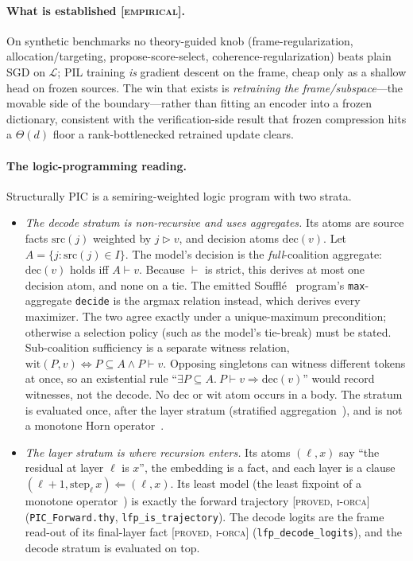 \documentclass[11pt]{article}
\theoremstyle{definition}
\theoremstyle{plain}
\theoremstyle{remark}
\newcommand{\proved}{\textsc{[proved, i-orca]}}
\newcommand{\empirical}{\textsc{[empirical]}}
\begin{document}
\paragraph{What is established \empirical{}.} On synthetic benchmarks no theory-guided knob
(frame-regularization, allocation/targeting, propose-score-select, coherence-regularization) beats plain
SGD on $\mathcal{L}$; PIL training \emph{is} gradient descent on the frame, cheap only as a shallow head
on frozen sources. The win that exists is \emph{retraining the frame/subspace}---the movable side of the
boundary---rather than fitting an encoder into a frozen dictionary, consistent with the verification-side
result that frozen compression hits a $\Theta(d)$ floor a rank-bottlenecked retrained update clears.

\paragraph{The logic-programming reading.} Structurally PIC is a semiring-weighted logic program with
two strata.
\begin{itemize}[nosep]
  \item \emph{The decode stratum is non-recursive and uses aggregates.} Its atoms are source facts
        $\mathrm{src}(j)$ weighted by $j\triangleright v$, and decision atoms $\mathrm{dec}(v)$. Let
        $A=\{j:\mathrm{src}(j)\in I\}$. The model's decision is the \emph{full}-coalition aggregate:
        $\mathrm{dec}(v)$ holds iff $A\vdash v$. Because $\vdash$ is strict, this derives at most one
        decision atom, and none on a tie. The emitted Souffl\'e~\cite{jordan2016souffle} program's \texttt{max}-aggregate \texttt{decide} is the
        argmax relation instead, which derives every maximizer. The two agree exactly under a
        unique-maximum precondition; otherwise a selection policy (such as the model's tie-break) must be
        stated. Sub-coalition
        sufficiency is a separate witness relation,
        $\mathrm{wit}(P,v)\Leftrightarrow P\subseteq A\wedge P\vdash v$. Opposing singletons can witness
        different tokens at once, so an existential rule
        ``$\exists P\subseteq A.\ P\vdash v\Rightarrow\mathrm{dec}(v)$'' would record witnesses, not the
        decode. No $\mathrm{dec}$ or $\mathrm{wit}$ atom occurs in a body. The stratum is evaluated once,
        after the layer stratum (stratified aggregation~\cite{apt1988towards}), and is not a monotone Horn
        operator~\cite{vanemden1976semantics}.
  \item \emph{The layer stratum is where recursion enters.} Its atoms $(\ell,x)$ say ``the residual at
        layer $\ell$ is $x$'', the embedding is a fact, and each layer is a clause
        $(\ell{+}1,\mathrm{step}_\ell\,x)\Leftarrow(\ell,x)$. Its least model (the least fixpoint of a monotone
        operator~\cite{tarski1955lattice,vanemden1976semantics}) is exactly the forward
        trajectory \proved{} (\texttt{PIC\_Forward.thy}, \texttt{lfp\_is\_trajectory}). The decode logits are
        the frame read-out of its final-layer fact \proved{} (\texttt{lfp\_decode\_logits}), and the
        decode stratum is evaluated on top.
\end{itemize}
\end{document}
